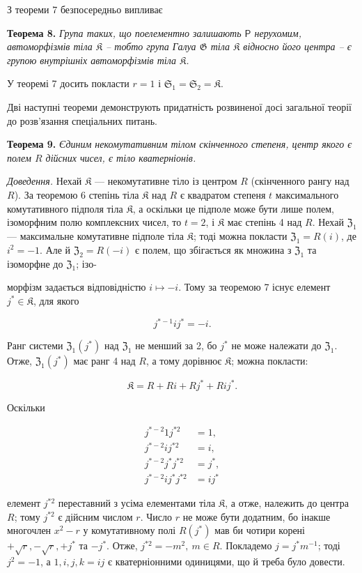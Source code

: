 \documentclass[11pt]{article}
\begin{document}
З теореми 7 безпосередньо випливає

\textbf{Теорема 8.} \emph{Група таких, що поелементно залишають \(\mathsf P\) нерухомим, автоморфізмів тіла \(\mathfrak K\) -- тобто група Галуа \(\mathfrak G\) тіла \(\mathfrak K\) відносно його центра -- є групою внутрішніх автоморфізмів тіла \(\mathfrak K\).}

У теоремі 7 досить покласти \(r=1\) і \(\mathfrak S_1=\mathfrak S_2=\mathfrak K\).

Дві наступні теореми демонструють придатність розвиненої досі загальної теорії до розв'язання спеціальних питань.

\textbf{Теорема 9.} \emph{Єдиним некомутативним тілом скінченного степеня, центр якого є полем \(R\) дійсних чисел, є тіло кватерніонів.}

\emph{Доведення.} Нехай \(\mathfrak K\) --- некомутативне тіло із центром \(R\) (скінченного рангу над \(R\)). За теоремою 6 степінь тіла \(\mathfrak K\) над \(R\) є квадратом степеня \(t\) максимального комутативного підполя тіла \(\mathfrak K\), а оскільки це підполе може бути лише полем, ізоморфним полю комплексних чисел, то \(t=2\), і \(\mathfrak K\) має степінь 4 над \(R\). Нехай \(\mathfrak Z_1\) --- максимальне комутативне підполе тіла \(\mathfrak K\); тоді можна покласти \(\mathfrak Z_1=R(i)\), де \(i^2=-1\). Але й \(\mathfrak Z_2=R(-i)\) є полем, що збігається як множина з \(\mathfrak Z_1\) та ізоморфне до \(\mathfrak Z_1\); ізо-

морфізм задається відповідністю \(i\mapsto -i\). Тому за теоремою 7 існує елемент \(j^*\in\mathfrak K\), для якого

\[
j^{*-1}ij^*=-i.
\]

Ранг системи \(\mathfrak Z_1(j^*)\) над \(\mathfrak Z_1\) не менший за 2, бо \(j^*\) не може належати до \(\mathfrak Z_1\). Отже, \(\mathfrak Z_1(j^*)\) має ранг 4 над \(R\), а тому дорівнює \(\mathfrak K\); можна покласти:

\[
\mathfrak K=R+Ri+Rj^*+Rij^*.
\]

Оскільки

\[
\begin{aligned}
j^{*-2}1j^{*2}&=1,\\
j^{*-2}ij^{*2}&=i,\\
j^{*-2}j^*j^{*2}&=j^*,\\
j^{*-2}ij^*j^{*2}&=ij^*
\end{aligned}
\]

елемент \(j^{*2}\) переставний з усіма елементами тіла \(\mathfrak K\), а отже, належить до центра \(R\); тому \(j^{*2}\) є дійсним числом \(r\). Число \(r\) не може бути додатним, бо інакше многочлен \(x^2-r\) у комутативному полі \(R(j^*)\) мав би чотири корені \(+\sqrt r,-\sqrt r,+j^*\) та \(-j^*\). Отже, \(j^{*2}=-m^2,\ m\in R\). Покладемо \(j=j^*m^{-1}\); тоді \(j^2=-1\), а \(1,i,j,k=ij\) є кватерніонними одиницями, що й треба було довести.
\end{document}

